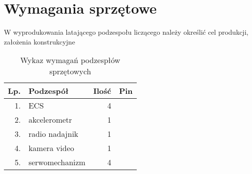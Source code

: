 \section{Wymagania sprzętowe}
\paragraph{}

W wyprodukowania latającego podzespołu liczącego należy określić cel produkcji, założenia konstrukcyjne 
\begin{table}
  \centering
  \caption{Wykaz wymagań podzespłów sprzętowych}
  \begin{tabular}{|r|l|r|l|}
  \hline
  Lp. & Podzespół & Ilość & Pin \\
  \hline
  1. & ECS & 4 & \\
  \hline
  2. & akcelerometr & 1 & \\
  \hline
  3. & radio nadajnik & 1 & \\
  \hline
  4. & kamera video & 1 & \\
  \hline
  5. & serwomechanizm & 4 & \\
  \hline
  \end{tabular}
\end{table}
